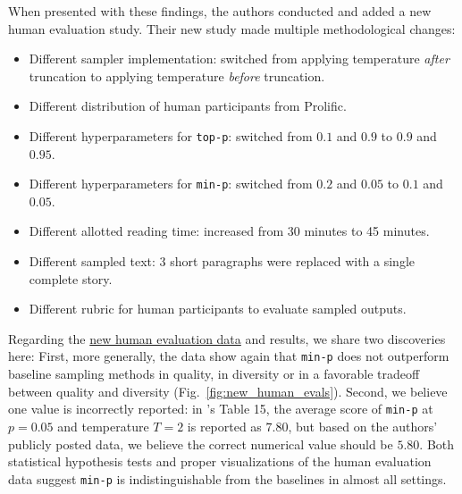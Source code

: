 When presented with these findings, the authors conducted and added a new human evaluation study.
Their new study made multiple methodological changes:
%
\begin{itemize}
    \item Different sampler implementation: switched from applying temperature \textit{after} truncation to applying temperature \textit{before} truncation.
    \item Different distribution of human participants from Prolific.
    \item Different hyperparameters for \texttt{top-p}: switched from $0.1$ and $0.9$ to $0.9$ and $0.95$.
    \item Different hyperparameters for \texttt{min-p}: switched from $0.2$ and $0.05$ to $0.1$ and $0.05$.
    \item Different allotted reading time: increased from 30 minutes to 45 minutes.
    \item Different sampled text: 3 short paragraphs were replaced with a single complete story.
    \item Different rubric for human participants to evaluate sampled outputs.
\end{itemize}
%
Regarding the \href{https://github.com/menhguin/minp_paper/blob/main/%5BLIVE%5D%20min_p%20user%20preference%20study%20v3.0%20(Responses)%20-%20Form%20responses%201.csv}{new human evaluation data} and results, we share two discoveries here:
First, more generally, the data show again that \texttt{min-p} does not outperform baseline sampling methods in quality, in diversity or in a favorable tradeoff between quality and diversity (Fig.~\ref{fig:new_human_evals}).
Second, we believe one value is incorrectly reported: in \citet{nguyen2024minp}'s Table 15, the average score of \texttt{min-p} at $p=0.05$ and temperature $T=2$ is reported as $7.80$, but based on the authors' publicly posted data, we believe the correct numerical value should be $5.80$. 
Both statistical hypothesis tests and proper visualizations of the human evaluation data suggest \texttt{min-p} is indistinguishable from the baselines in almost all settings.






%
